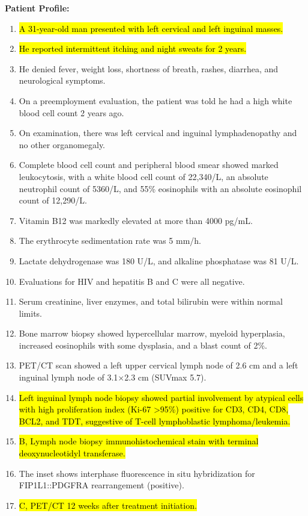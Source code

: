 \documentclass[11pt]{article}
\newcommand{\traineeHigh}[1]{\hl{#1}}
\begin{document}
\begin{tcolorbox}[colback=blue!3!white, colframe=blue!50!white,
                  title=Example of QA Data (from JAMA QA ID0973), left=10mm, breakable]
\small

\textbf{Patient Profile:}
\begin{enumerate}
  \item \traineeHigh{A 31-year-old man presented with left cervical and left inguinal masses.}
  \item \traineeHigh{He reported intermittent itching and night sweats for 2 years.}
  \item He denied fever, weight loss, shortness of breath, rashes, diarrhea, and neurological symptoms.
  \item On a preemployment evaluation, the patient was told he had a high white blood cell count 2 years ago.
  \item On examination, there was left cervical and inguinal lymphadenopathy and no other organomegaly.
  \item Complete blood cell count and peripheral blood smear showed marked leukocytosis, with a white blood cell count of 22{,}340/\textmu L, an absolute neutrophil count of 5360/\textmu L, and 55\% eosinophils with an absolute eosinophil count of 12{,}290/\textmu L.
  \item Vitamin B12 was markedly elevated at more than 4000 pg/mL.
  \item The erythrocyte sedimentation rate was 5 mm/h.
  \item Lactate dehydrogenase was 180 U/L, and alkaline phosphatase was 81 U/L.
  \item Evaluations for HIV and hepatitis B and C were all negative.
  \item Serum creatinine, liver enzymes, and total bilirubin were within normal limits.
  \item Bone marrow biopsy showed hypercellular marrow, myeloid hyperplasia, increased eosinophils with some dysplasia, and a blast count of 2\%.
  \item PET/CT scan showed a left upper cervical lymph node of 2.6 cm and a left inguinal lymph node of 3.1$\times$2.3 cm (SUVmax 5.7).
  \item \traineeHigh{Left inguinal lymph node biopsy showed partial involvement by atypical cells with high proliferation index (Ki-67 >95\%) positive for CD3, CD4, CD8, BCL2, and TDT, suggestive of T-cell lymphoblastic lymphoma/leukemia.}
  \item \traineeHigh{B, Lymph node biopsy immunohistochemical stain with terminal deoxynucleotidyl transferase.}
  \item The inset shows interphase fluorescence in situ hybridization for FIP1L1::PDGFRA rearrangement (positive).
  \item \traineeHigh{C, PET/CT 12 weeks after treatment initiation.}
\end{enumerate}


\end{tcolorbox}
\end{document}
